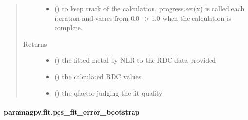 \documentclass[a4paper,10pt,english,openany,oneside]{sphinxmanual}
\begin{document}
\begin{fulllineitems}
\begin{quote}
\begin{description}
\begin{itemize}
\item {} 
 (\sphinxstyleliteralemphasis{\sphinxupquote{, }}) \textendash{} to keep track of the calculation, progress.set(x) is called each
iteration and varies from 0.0 -\textgreater{} 1.0 when the calculation is complete.

\end{itemize}

\item[{Returns}] \leavevmode
\begin{itemize}
\item {} 
 () \textendash{} the fitted metal by NLR to the RDC data provided

\item {} 
 () \textendash{} the calculated RDC values

\item {} 
 () \textendash{} the qfactor judging the fit quality

\end{itemize}


\end{description}\end{quote}

\end{fulllineitems}



\paragraph{paramagpy.fit.pcs\_fit\_error\_bootstrap}
\label{\detokenize{reference/generated/paramagpy.fit.pcs_fit_error_bootstrap:paramagpy-fit-pcs-fit-error-bootstrap}}\label{\detokenize{reference/generated/paramagpy.fit.pcs_fit_error_bootstrap::doc}}
\end{document}
